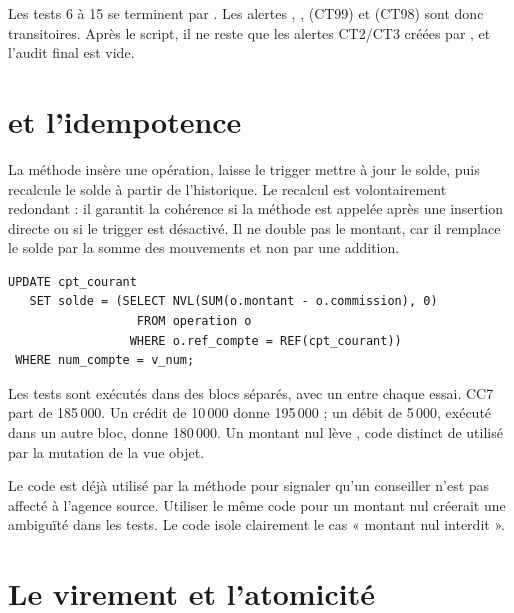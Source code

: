 \begin{attentionbox}
Les tests 6 à 15 se terminent par . Les alertes
, , 
(CT99) et  (CT98) sont donc transitoires. Après le
script, il ne reste que les alertes CT2/CT3 créées par
, et l'audit final est vide.
\end{attentionbox}

\section{ et l'idempotence}

La méthode  insère une opération, laisse le trigger
 mettre à jour le solde, puis recalcule le solde à partir de
l'historique. Le recalcul est volontairement redondant : il garantit la
cohérence si la méthode est appelée après une insertion directe ou si le
trigger est désactivé. Il ne double pas le montant, car il remplace le solde par
la somme des mouvements et non par une addition.

\begin{lstlisting}[caption={Recalcul idempotent du solde dans \code{passeMvt}.},label={lst:recalcul-solde}]
UPDATE cpt_courant
   SET solde = (SELECT NVL(SUM(o.montant - o.commission), 0)
                  FROM operation o
                 WHERE o.ref_compte = REF(cpt_courant))
 WHERE num_compte = v_num;
\end{lstlisting}

Les tests sont exécutés dans des blocs séparés, avec un  entre
chaque essai. CC7 part de 185\,000. Un crédit de 10\,000 donne 195\,000 ; un
débit de 5\,000, exécuté dans un autre bloc, donne 180\,000. Un montant nul
lève , code distinct de  utilisé par la
mutation de la vue objet.

\begin{clebox}
Le code  est déjà utilisé par la méthode  pour
signaler qu'un conseiller n'est pas affecté à l'agence source. Utiliser le même
code pour un montant nul créerait une ambiguïté dans les tests. Le code
 isole clairement le cas « montant nul interdit ».
\end{clebox}

\section{Le virement et l'atomicité}

